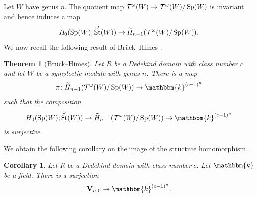 \documentclass[11pt,letterpaper]{amsart}
\newcommand{\bk}{\mathbbm{k}}
\DeclareMathOperator{\Sp}{Sp}
\newcommand{\VV}{\mathbf{V}}
\numberwithin{theoremcounter}{section}
\newtheorem{theorem}[theoremauto]{Theorem}
\newtheorem{corollary}[corollaryauto]{Corollary}
\theoremstyle{definition}
\theoremstyle{remark}
\DeclareMathOperator{\GL}{GL}
\DeclareMathOperator{\St}{St}
\begin{document}
Let $W$ have genus $n$. The quotient map $\cT^\omega(W) \to \cT^\omega(W)/\Sp(W)$ is invariant and hence induces a map $$H_0(\Sp(W);\St^\omega(W)  ) \to \widetilde H_{n-1}( \cT^\omega(W)/\Sp(W)). $$ We now recall the following result of Br\"uck--Himes \cite[Theorem 1.2 and Section 3]{BH}.

\begin{theorem}[Br\"uck--Himes]\label{bruckhimes} Let $R$ be a Dedekind domain with class number $c$ and let $W$ be a symplectic module with genus $n$. There is a map $$\pi \colon \widetilde H_{n-1}( \cT^\omega(W)/\Sp(W)) \to \bk^{(c-1)^n}$$ such that the composition
$$  H_0(\Sp(W);\St^\omega(W)  )  \to \widetilde H_{n-1}( \cT^\omega(W)/\Sp(W)) \to \bk^{(c-1)^n}$$ is surjective.
\end{theorem}



We obtain the following corollary on the image of the structure homomorphism. 

\begin{corollary} \label{Cor2} Let $R$ be a Dedekind domain with class number $c$. Let $\bk$ be a field. There is a surjection $$\VV_{n,0} \twoheadrightarrow \bk^{(c-1)^n}.$$

\end{corollary}
\end{document}

